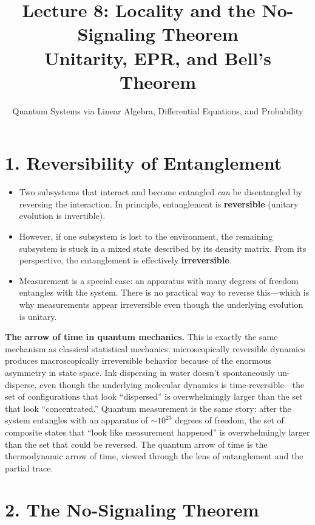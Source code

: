 \documentclass[12pt,a4paper]{article}
\title{\textbf{Lecture 8: Locality and the No-Signaling Theorem} \\ \large Unitarity, EPR, and Bell's Theorem}
\author{Quantum Systems via Linear Algebra, Differential Equations, and Probability}
\date{}
\begin{document}
\maketitle
\thispagestyle{fancy}

\section{1. Reversibility of Entanglement}

\begin{itemize}[nosep]
    \item Two subsystems that interact and become entangled \emph{can} be disentangled by reversing the interaction.  In principle, entanglement is \textbf{reversible} (unitary evolution is invertible).
    \item However, if one subsystem is lost to the environment, the remaining subsystem is stuck in a mixed state described by its density matrix.  From its perspective, the entanglement is effectively \textbf{irreversible}.
    \item Measurement is a special case: an apparatus with many degrees of freedom entangles with the system.  There is no practical way to reverse this---which is why measurements appear irreversible even though the underlying evolution is unitary.
\end{itemize}

\medskip
\noindent\textbf{The arrow of time in quantum mechanics.}  This is exactly the same mechanism as classical statistical mechanics: microscopically reversible dynamics produces macroscopically irreversible behavior because of the enormous asymmetry in state space.  Ink dispersing in water doesn't spontaneously un-disperse, even though the underlying molecular dynamics is time-reversible---the set of configurations that look ``dispersed'' is overwhelmingly larger than the set that look ``concentrated.''  Quantum measurement is the same story: after the system entangles with an apparatus of $\sim 10^{23}$ degrees of freedom, the set of composite states that ``look like measurement happened'' is overwhelmingly larger than the set that could be reversed.  The quantum arrow of time is the thermodynamic arrow of time, viewed through the lens of entanglement and the partial trace.

\section{2. The No-Signaling Theorem}
\end{document}
